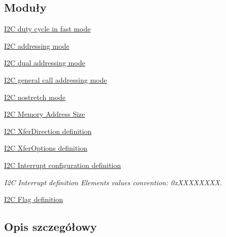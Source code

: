 \subsection*{Moduły}
\begin{DoxyCompactItemize}
\item 
\hyperlink{group___i2_c__duty__cycle__in__fast__mode}{I2\+C duty cycle in fast mode}
\item 
\hyperlink{group___i2_c__addressing__mode}{I2\+C addressing mode}
\item 
\hyperlink{group___i2_c__dual__addressing__mode}{I2\+C dual addressing mode}
\item 
\hyperlink{group___i2_c__general__call__addressing__mode}{I2\+C general call addressing mode}
\item 
\hyperlink{group___i2_c__nostretch__mode}{I2\+C nostretch mode}
\item 
\hyperlink{group___i2_c___memory___address___size}{I2\+C Memory Address Size}
\item 
\hyperlink{group___i2_c___xfer_direction__definition}{I2\+C Xfer\+Direction definition}
\item 
\hyperlink{group___i2_c___xfer_options__definition}{I2\+C Xfer\+Options definition}
\item 
\hyperlink{group___i2_c___interrupt__configuration__definition}{I2\+C Interrupt configuration definition}
\begin{DoxyCompactList}\small\item\em I2C Interrupt definition Elements values convention\+: 0x\+X\+X\+X\+X\+X\+X\+XX. \end{DoxyCompactList}\item 
\hyperlink{group___i2_c___flag__definition}{I2\+C Flag definition}
\end{DoxyCompactItemize}


\subsection{Opis szczegółowy}
